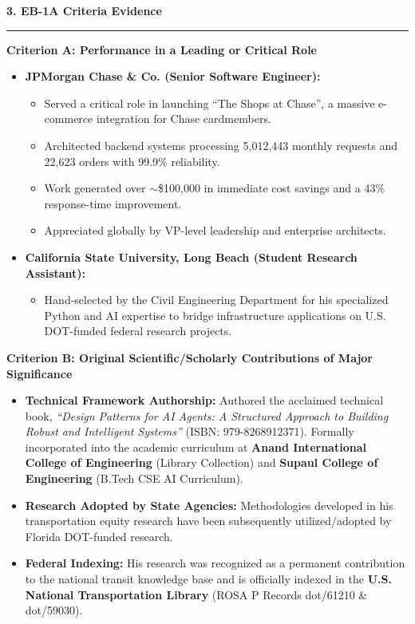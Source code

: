 \documentclass[11pt]{article}
\begin{document}
\vspace{1em}
{\Large\bfseries\color{blue!60!black} 3. EB-1A Criteria Evidence} \hrule\vspace{0.5em}

\vspace{0.5em}
{\large\bfseries Criterion A: Performance in a Leading or Critical Role}
\begin{itemize}
    \item \textbf{JPMorgan Chase \& Co. (Senior Software Engineer):} 
    \begin{itemize}
        \item Served a critical role in launching ``The Shops at Chase'', a massive e-commerce integration for Chase cardmembers.
        \item Architected backend systems processing 5,012,443 monthly requests and 22,623 orders with 99.9\% reliability.
        \item Work generated over $\sim$\$100,000 in immediate cost savings and a 43\% response-time improvement.
        \item Appreciated globally by VP-level leadership and enterprise architects.
    \end{itemize}
    \item \textbf{California State University, Long Beach (Student Research Assistant):}
    \begin{itemize}
        \item Hand-selected by the Civil Engineering Department for his specialized Python and AI expertise to bridge infrastructure applications on U.S. DOT-funded federal research projects.
    \end{itemize}
\end{itemize}

\vspace{0.5em}
{\large\bfseries Criterion B: Original Scientific/Scholarly Contributions of Major Significance}
\begin{itemize}
    \item \textbf{Technical Framework Authorship:} Authored the acclaimed technical book, \textit{``Design Patterns for AI Agents: A Structured Approach to Building Robust and Intelligent Systems''} (ISBN: 979-8268912371). Formally incorporated into the academic curriculum at \textbf{Anand International College of Engineering} (Library Collection) and \textbf{Supaul College of Engineering} (B.Tech CSE AI Curriculum).
    \item \textbf{Research Adopted by State Agencies:} Methodologies developed in his transportation equity research have been subsequently utilized/adopted by Florida DOT-funded research.
    \item \textbf{Federal Indexing:} His research was recognized as a permanent contribution to the national transit knowledge base and is officially indexed in the \textbf{U.S. National Transportation Library} (ROSA P Records dot/61210 \& dot/59030).
\end{itemize}
\end{document}
